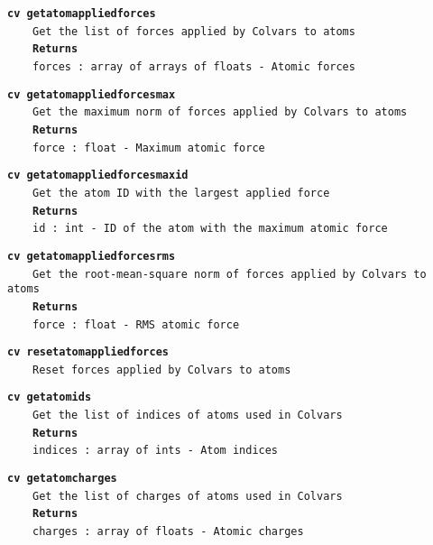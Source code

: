 \begin{mdexampleinput}{}
\texttt{\textbf{cv getatomappliedforces}}
\\
\-~~~~\texttt{Get the list of forces applied by Colvars to atoms}
\\
\-~~~~\texttt{\textbf{Returns}}
\\
\-~~~~\texttt{forces : array of arrays of floats - Atomic forces}
\end{mdexampleinput}
\begin{mdexampleinput}{}
\texttt{\textbf{cv getatomappliedforcesmax}}
\\
\-~~~~\texttt{Get the maximum norm of forces applied by Colvars to atoms}
\\
\-~~~~\texttt{\textbf{Returns}}
\\
\-~~~~\texttt{force : float - Maximum atomic force}
\end{mdexampleinput}
\begin{mdexampleinput}{}
\texttt{\textbf{cv getatomappliedforcesmaxid}}
\\
\-~~~~\texttt{Get the atom ID with the largest applied force}
\\
\-~~~~\texttt{\textbf{Returns}}
\\
\-~~~~\texttt{id : int - ID of the atom with the maximum atomic force}
\end{mdexampleinput}
\begin{mdexampleinput}{}
\texttt{\textbf{cv getatomappliedforcesrms}}
\\
\-~~~~\texttt{Get the root-mean-square norm of forces applied by Colvars to atoms}
\\
\-~~~~\texttt{\textbf{Returns}}
\\
\-~~~~\texttt{force : float - RMS atomic force}
\end{mdexampleinput}
\begin{mdexampleinput}{}
\texttt{\textbf{cv resetatomappliedforces}}
\\
\-~~~~\texttt{Reset forces applied by Colvars to atoms}
\end{mdexampleinput}
\begin{mdexampleinput}{}
\texttt{\textbf{cv getatomids}}
\\
\-~~~~\texttt{Get the list of indices of atoms used in Colvars}
\\
\-~~~~\texttt{\textbf{Returns}}
\\
\-~~~~\texttt{indices : array of ints - Atom indices}
\end{mdexampleinput}
\begin{mdexampleinput}{}
\texttt{\textbf{cv getatomcharges}}
\\
\-~~~~\texttt{Get the list of charges of atoms used in Colvars}
\\
\-~~~~\texttt{\textbf{Returns}}
\\
\-~~~~\texttt{charges : array of floats - Atomic charges}
\end{mdexampleinput}
